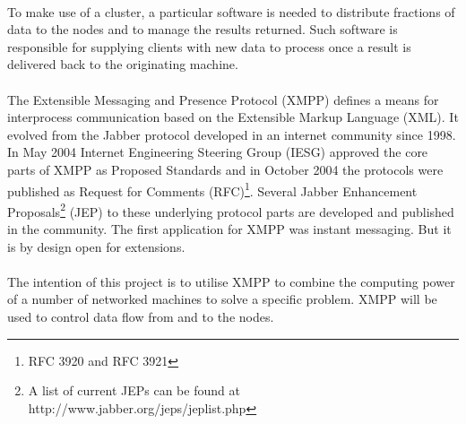 \paragraph{}
To make use of a cluster, a particular software is needed to distribute fractions of data to the nodes and to manage the results returned. Such software is responsible for supplying clients with new data to process once a result is delivered back to the originating machine.
\paragraph{}
The Extensible Messaging and Presence Protocol (XMPP) defines a means for interprocess communication based on the Extensible Markup Language (XML). It evolved from the Jabber protocol developed in an internet community since 1998. In May 2004 Internet Engineering Steering Group (IESG) approved the core parts of XMPP \cite{xmpp-core,xmpp-im} as Proposed Standards and in October 2004 the protocols were published as Request for Comments (RFC)\footnote{RFC 3920 and RFC 3921}. Several Jabber Enhancement Proposals\footnote{A list of current JEPs can be found at http://www.jabber.org/jeps/jeplist.php} (JEP) to these underlying protocol parts are developed and published in the community. The first application for XMPP was instant messaging. But it is by design open for extensions.
\paragraph{}
The intention of this project is to utilise XMPP to combine the computing power of a number of networked machines to solve a specific problem. XMPP will be used to control data flow from and to the nodes.
